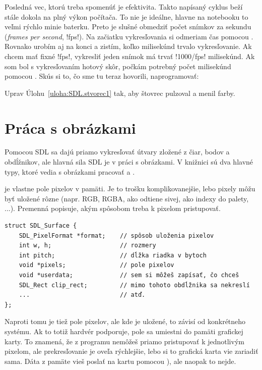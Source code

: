 Posledná vec, ktorú treba spomenúť je efektivita. Takto napísaný cyklus beží stále dokola na plný výkon počítača. To nie je ideálne, hlavne na notebooku to veľmi rýchlo minie
baterku. Preto je slušné obmedziť počet snímkov za sekundu ({\em frames per second}, \prg!fps!). Na začiatku vykresľovania si odmeriam čas pomocou 
\hbox{.} Rovnako urobím aj na konci a zistím, koľko milisekúnd trvalo vykresľovanie. Ak chcem mať fixné \prg!fps!, vykresliť jeden snímok má 
trvať \prg!1000/fps! milisekúnd. Ak som bol s vykresľovaním hotový skôr, počkám potrebný počet milisekúnd pomocou . Skús si to, čo sme
tu teraz hovorili, naprogramovať:

\begin{uloha}
  Uprav Úlohu~\ref{uloha:SDL.stvorec1} tak, aby štovrec pulzoval a menil farby.
\end{uloha}

\section*{Práca s obrázkami}

Pomocou SDL sa dajú priamo vykresľovať útvary zložené z čiar, bodov a obdĺžnikov, ale 
hlavná sila SDL je v práci s obrázkami. V knižnici sú dva hlavné typy, ktoré vedia s
obrázkami pracovať \hbox{} a \hbox{.}

 je vlastne pole pixelov v pamäti. Je to trošku komplikovanejšie, lebo
pixely môžu byť uložené rôzne (napr. RGB, RGBA, ako odtiene sivej, ako indexy do palety, ...).
Premenná  popisuje, akým spôsobom treba k pixelom pristupovať.

\begin{lstlisting}
struct SDL_Surface {
    SDL_PixelFormat *format;    // spôsob uloženia pixelov
    int w, h;                   // rozmery
    int pitch;                  // dĺžka riadka v bytoch
    void *pixels;               // pole pixelov
    void *userdata;             // sem si môžeš zapísať, čo chceš
    SDL_Rect clip_rect;         // mimo tohoto obdĺžnika sa nekreslí
    ...                         // atď.
};
\end{lstlisting}

Naproti tomu  je tiež pole pixelov, ale kde je uložené, to závisí od 
konkrétneho systému. Ak to totiž hardvér podporuje, pole sa umiestni do pamäti  grafickej karty. To znamená,
že z programu nemôžeš priamo pristupovať k jednotlivým pixelom, ale prekresľovanie je 
oveľa rýchlejšie, lebo si to grafická karta vie zariadiť sama. Dáta z pamäte vieš poslať
na kartu
pomocou ), ale naopak to nejde.

